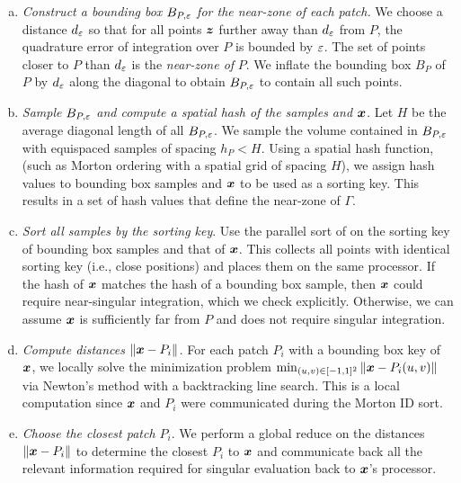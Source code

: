 \begin{enumerate}[a.]
  \item\label{step:bbnear} \textit{Construct a bounding box $B_{P,\varepsilon}$ for the near-zone of each patch.} 
    We choose a distance $d_\varepsilon$ so that for all points ${\bm{z}}$ further away than $d_\varepsilon$
    from $P$, the quadrature error of integration over $P$ is bounded by $\varepsilon$.
    The set of points closer to $P$ than $d_\varepsilon$ is the \textit{near-zone of
    }$P$.
    We inflate the bounding box $B_P$ of $P$ by $d_\varepsilon$ along the diagonal to
    obtain $B_{P,\varepsilon}$ to contain all such points.
  \item\label{step:computeid} \textit{Sample $B_{P,\varepsilon}$ and compute
    a spatial hash of the samples and ${\bm{x}}$.}
    Let $H$ be the average diagonal length of all $B_{P,\varepsilon}$.
    We sample the volume contained in $B_{P,\varepsilon}$ with equispaced samples of spacing $h_P < H$.
    Using a spatial hash function, (such as Morton ordering with a spatial grid
    of spacing $H$), we assign hash values to bounding box samples and ${\bm{x}}$
    to be used as a sorting key.
    This results in a set of hash values that define the near-zone of $\Gamma$.
  \item\label{step:sort} \textit{Sort all samples by the sorting key}. Use the
    parallel sort of \cite{Sundar2013} on the sorting key of bounding box samples and that of ${\bm{x}}$. 
    This collects all points with identical sorting key (i.e., close positions) and places them on the same processor.    
    If the hash of ${\bm{x}}$ matches the hash of a bounding box sample,
    then ${\bm{x}}$ could require near-singular integration, which we check explicitly.
    Otherwise, we can assume ${\bm{x}}$ is sufficiently far from $P$ and does not require singular integration.
  \item\label{step:distance} \textit{Compute distances $\|{\bm{x}} - P_i\|$.} For
    each patch $P_i$ with a bounding box key of ${\bm{x}}$, we locally solve the minimization problem $\min_{(u,v) \in [-1,1]^2} \|{\bm{x}} - P_i(u,v)\|$ via Newton's method with a backtracking line search.
    This is a local computation since ${\bm{x}}$ and $P_i$ were communicated during the Morton ID sort.
  \item\label{step:closest} \textit{Choose the closest patch $P_i$}. We perform a global reduce on the distances $\|{\bm{x}} - P_i\|$ to determine the closest $P_i$ to ${\bm{x}}$ and communicate back all the relevant information required for singular evaluation back to ${\bm{x}}$'s processor.
\end{enumerate}


